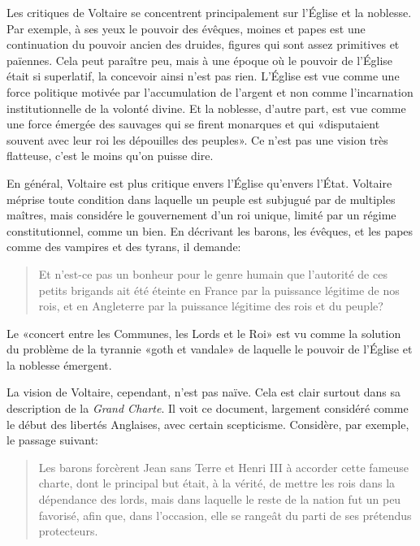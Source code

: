 \documentclass[a4paper, 12pt]{article}
\begin{document}
Les critiques de Voltaire se concentrent principalement sur l'Église et la
noblesse. Par exemple, à ses yeux le pouvoir des évêques, moines et papes est
une continuation du pouvoir ancien des druides, figures qui sont assez
primitives et païennes. Cela peut paraître peu, mais à une époque où le pouvoir
de l'Église était si superlatif, la concevoir ainsi n'est pas rien. L'Église est
vue comme une force politique motivée par l'accumulation de l'argent et non
comme l'incarnation institutionnelle de la volonté divine. Et la noblesse,
d'autre part, est vue comme une force émergée des sauvages qui se
firent monarques et qui «disputaient souvent avec leur roi les dépouilles des
peuples». Ce n'est pas une vision très flatteuse, c'est le moins qu'on puisse
dire.

En général, Voltaire est plus critique envers l'Église qu'envers l'État.
Voltaire méprise toute condition dans laquelle un peuple est subjugué par de
multiples maîtres, mais considére le gouvernement d'un roi unique, limité par un
régime constitutionnel, comme un bien. En décrivant les barons, les évêques, et
les papes comme des vampires et des tyrans, il demande:

\begin{quote}
Et n'est-ce pas un
bonheur pour le genre humain que l'autorité de ces petits brigands ait été éteinte
en France par la puissance légitime de nos rois, et en Angleterre par la puissance
légitime des rois et du peuple?
\end{quote}

Le «concert entre les Communes, les Lords et le Roi» est vu comme la solution du
problème de la tyrannie «goth et vandale» de laquelle le pouvoir de l'Église et
la noblesse émergent.

La vision de Voltaire, cependant, n'est pas naïve. Cela est clair surtout dans
sa description de la \textit{Grand Charte}. Il voit ce document, largement
considéré comme le début des libertés Anglaises, avec certain scepticisme. Considère,
par exemple, le passage suivant:

\begin{quote}
    Les barons forcèrent Jean sans Terre et Henri III à accorder cette fameuse
    charte, dont le principal but était, à la vérité, de mettre les rois dans la
    dépendance des lords, mais dans laquelle le reste de la nation fut un peu
    favorisé, afin que, dans l'occasion, elle se rangeât du parti de ses
    prétendus protecteurs.
\end{quote}
\end{document}
